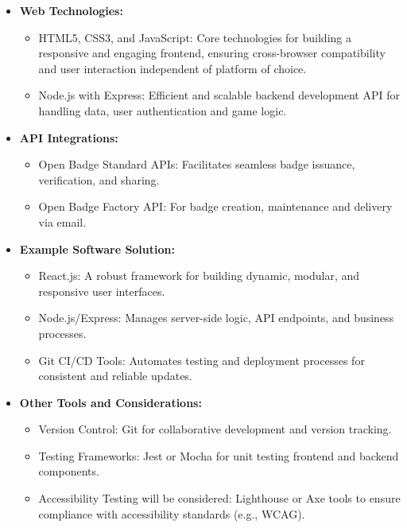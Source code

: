 \begin{itemize}
    
    \item \textbf{Web Technologies:} 
    \begin{itemize}
        \item HTML5, CSS3, and JavaScript: Core technologies for building a responsive and engaging frontend, ensuring cross-browser compatibility and user interaction independent of platform of choice.
        \item Node.js with Express: Efficient and scalable backend development API for handling data, user authentication and game logic.
    \end{itemize}
    
    \item \textbf{API Integrations:}
    \begin{itemize}
        \item Open Badge Standard APIs: Facilitates seamless badge issuance, verification, and sharing.
        \item Open Badge Factory API: For badge creation, maintenance and delivery via email.
    \end{itemize}
    
    \item \textbf{Example Software Solution:}
    \begin{itemize}
        \item React.js: A robust framework for building dynamic, modular, and responsive user interfaces.
        \item Node.js/Express: Manages server-side logic, API endpoints, and business processes.
        \item Git CI/CD Tools: Automates testing and deployment processes for consistent and reliable updates.
    \end{itemize}
    
    \item \textbf{Other Tools and Considerations:}
    \begin{itemize}
        \item Version Control: Git for collaborative development and version tracking.
        \item Testing Frameworks: Jest or Mocha for unit testing frontend and backend components.
        \item Accessibility Testing will be considered: Lighthouse or Axe tools to ensure compliance with accessibility standards (e.g., WCAG).
    \end{itemize}
\end{itemize}